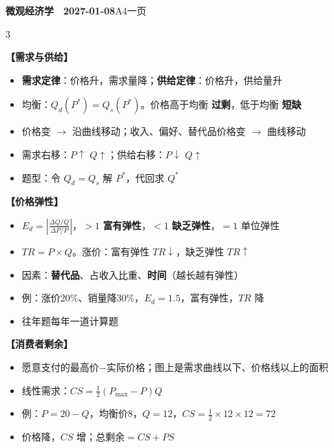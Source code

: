 \documentclass[a4paper,fontset=windows]{ctexart}
\newlength{\sbw}
\newcommand{\kw}[1]{\ifdefined\SBFILL\settowidth{\sbw}{#1}\underline{\hspace*{\dimexpr\sbw+0.6em\relax}}\else\textbf{#1}\fi}
\newcommand{\hd}[1]{\par\vspace{2pt}\textbf{【#1】}}
\begin{document}
{\bfseries 微观经济学　2027-01-08}\hfill{\color{gray}A4一页}
\begin{multicols}{3}
\hd{需求与供给}
\begin{itemize}
\item \kw{需求定律}：价格升，需求量降；\kw{供给定律}：价格升，供给量升
\item 均衡：$Q_d(P^*)=Q_s(P^*)$。价格高于均衡 \kw{过剩}，低于均衡 \kw{短缺}
\item 价格变 $\to$ 沿曲线移动；收入、偏好、替代品价格变 $\to$ 曲线移动
\item 需求右移：$P\uparrow$ $Q\uparrow$；供给右移：$P\downarrow$ $Q\uparrow$
\item 题型：令 $Q_d=Q_s$ 解 $P^*$，代回求 $Q^*$
\end{itemize}

\hd{价格弹性}
\begin{itemize}
\item $E_d=\left|\frac{\Delta Q/Q}{\Delta P/P}\right|$，$>1$ \kw{富有弹性}，$<1$ \kw{缺乏弹性}，$=1$ 单位弹性
\item $TR=P\times Q$。涨价：富有弹性 $TR\downarrow$，缺乏弹性 $TR\uparrow$
\item 因素：\kw{替代品}、占收入比重、\kw{时间}（越长越有弹性）
\item 例：涨价20\%、销量降30\%，$E_d=1.5$，富有弹性，$TR$ 降
\item 往年题每年一道计算题
\end{itemize}

\hd{消费者剩余}
\begin{itemize}
\item 愿意支付的最高价$-$实际价格；图上是需求曲线以下、价格线以上的面积
\item 线性需求：$CS=\frac12(P_{\max}-P)Q$
\item 例：$P=20-Q$，均衡价8，$Q=12$，$CS=\frac12\times12\times12=72$
\item 价格降，$CS$ 增；总剩余$=CS+PS$
\end{itemize}
\end{multicols}
\end{document}
